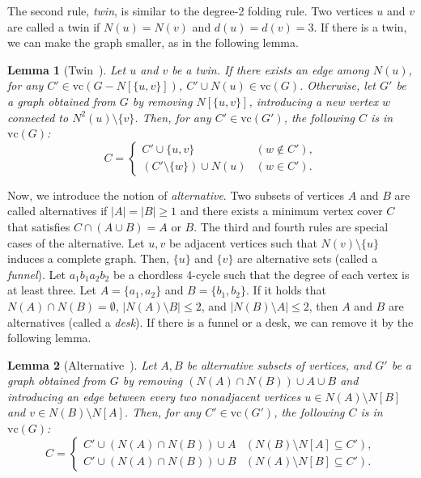 \documentclass[11pt]{article}
\newcommand{\vc}{\mathrm{vc}}
\newtheorem{lemma}{Lemma}
\begin{document}
The second rule, \emph{twin}, is similar to the degree-2 folding rule.
Two vertices $u$ and $v$ are called a twin if $N(u)=N(v)$ and $d(u)=d(v)=3$.
If there is a twin, we can make the graph smaller, as in the following lemma.
\begin{lemma}[Twin~\cite{vc_reduction/nagamochi2013}]
Let $u$ and $v$ be a twin.
If there exists an edge among $N(u)$, for any $C'\in\vc(G-N[\{u,v\}])$, $C'\cup N(u)\in\vc(G)$.
Otherwise, let $G'$ be a graph obtained from $G$ by removing $N[\{u,v\}]$, introducing a new vertex $w$ connected to $N^2(u)\setminus\{v\}$.
Then, for any $C'\in\vc(G')$, the following $C$ is in $\vc(G)$:
\begin{equation*}
C=\begin{cases}
C'\cup\{u,v\}&(w\not\in C'),\\
(C'\setminus\{w\})\cup N(u)&(w\in C').
\end{cases}
\end{equation*}
\end{lemma}

Now, we introduce the notion of \textit{alternative}.
Two subsets of vertices $A$ and $B$ are called alternatives if $|A|=|B|\geq 1$ and there exists a minimum vertex cover
$C$ that satisfies $C\cap (A\cup B)=A\text{ or }B$.
The third and fourth rules are special cases of the alternative.
Let $u, v$ be adjacent vertices such that $N(v)\setminus\{u\}$ induces a complete graph.
Then, $\{u\}$ and $\{v\}$ are alternative sets (called a \emph{funnel}).
Let $a_1b_1a_2b_2$ be a chordless 4-cycle such that the degree of each vertex is at least three.
Let $A=\{a_1,a_2\}$ and $B=\{b_1,b_2\}$.
If it holds that $N(A)\cap N(B)=\emptyset$, $|N(A)\setminus B|\leq 2$, and $|N(B)\setminus A|\leq 2$,
then $A$ and $B$ are alternatives (called a \emph{desk}).
If there is a funnel or a desk, we can remove it by the following lemma.
\begin{lemma}[Alternative~\cite{vc_reduction/nagamochi2013}]
Let $A, B$ be alternative subsets of vertices, and $G'$ be a graph obtained from $G$ by removing
$(N(A)\cap N(B))\cup A\cup B$ and introducing an edge between every two
nonadjacent vertices $u\in N(A)\setminus N[B]$ and $v\in N(B)\setminus N[A]$.
Then, for any $C'\in\vc(G')$, the following $C$ is in $\vc(G)$:
\begin{equation*}
C=\begin{cases}
C'\cup(N(A)\cap N(B))\cup A&(N(B)\setminus N[A]\subseteq C'),\\
C'\cup(N(A)\cap N(B))\cup B&(N(A)\setminus N[B]\subseteq C').
\end{cases}
\end{equation*}
\end{lemma}
\end{document}
